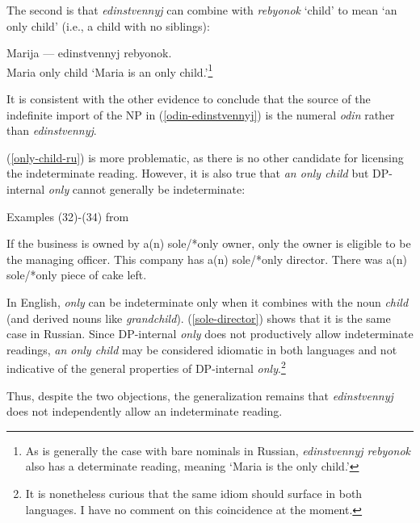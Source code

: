 \documentclass{article}
\begin{document}
The second is that \textit{edinstvennyj} can combine with \textit{rebyonok} `child' to mean `an only child' (i.e., a child with no siblings):

\begin{exe}
	\ex \label{only-child-ru} Marija --- edinstvennyj rebyonok.\\
	Maria {} only child
	\glt `Maria is an only child.'\footnote{As is generally the case with bare nominals in Russian, \textit{edinstvennyj rebyonok} also has a determinate reading, meaning `Maria is the only child.'}
\end{exe}

It is consistent with the other evidence to conclude that the source of the indefinite import of the NP in (\ref{odin-edinstvennyj}) is the numeral \textit{odin} rather than \textit{edinstvennyj}.

(\ref{only-child-ru}) is more problematic, as there is no other candidate for licensing the indeterminate reading. However, it is also true that \textit{an only child} but DP-internal \textit{only} cannot generally be indeterminate:


\begin{exe}
	\ex Examples (32)-(34) from \citet{cb2012a} \begin{xlist}
		\ex If the business is owned by a(n) sole/*only owner, only the owner is eligible to be the managing officer.
		\ex This company has a(n) sole/*only director.
		\ex There was a(n) sole/*only piece of cake left.
	\end{xlist}
\end{exe}

In English, \textit{only} can be indeterminate only when it combines with the noun \textit{child} (and derived nouns like \textit{grandchild}). (\ref{sole-director}) shows that it is the same case in Russian. Since DP-internal \textit{only} does not productively allow indeterminate readings, \textit{an only child} may be considered idiomatic in both languages and not indicative of the general properties of DP-internal \textit{only}.\footnote{It is nonetheless curious that the same idiom should surface in both languages. I have no comment on this coincidence at the moment.}

Thus, despite the two objections, the generalization remains that \textit{edinstvennyj} does not independently allow an indeterminate reading.
\end{document}
